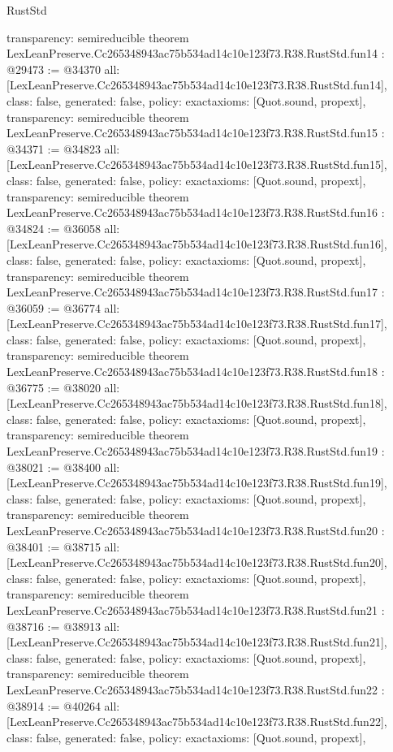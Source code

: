 \begin{lexlean}{RustStd}
\begin{coremodule}
{  transparency: semireducible
}
theorem LexLeanPreserve.Cc265348943ac75b534ad14c10e123f73.R38.RustStd.fun14 : @29473 := @34370 {
  all: [LexLeanPreserve.Cc265348943ac75b534ad14c10e123f73.R38.RustStd.fun14],
  class: false,
  generated: false,
  policy: exact{axioms: [Quot.sound, propext]},
  transparency: semireducible
}
theorem LexLeanPreserve.Cc265348943ac75b534ad14c10e123f73.R38.RustStd.fun15 : @34371 := @34823 {
  all: [LexLeanPreserve.Cc265348943ac75b534ad14c10e123f73.R38.RustStd.fun15],
  class: false,
  generated: false,
  policy: exact{axioms: [Quot.sound, propext]},
  transparency: semireducible
}
theorem LexLeanPreserve.Cc265348943ac75b534ad14c10e123f73.R38.RustStd.fun16 : @34824 := @36058 {
  all: [LexLeanPreserve.Cc265348943ac75b534ad14c10e123f73.R38.RustStd.fun16],
  class: false,
  generated: false,
  policy: exact{axioms: [Quot.sound, propext]},
  transparency: semireducible
}
theorem LexLeanPreserve.Cc265348943ac75b534ad14c10e123f73.R38.RustStd.fun17 : @36059 := @36774 {
  all: [LexLeanPreserve.Cc265348943ac75b534ad14c10e123f73.R38.RustStd.fun17],
  class: false,
  generated: false,
  policy: exact{axioms: [Quot.sound, propext]},
  transparency: semireducible
}
theorem LexLeanPreserve.Cc265348943ac75b534ad14c10e123f73.R38.RustStd.fun18 : @36775 := @38020 {
  all: [LexLeanPreserve.Cc265348943ac75b534ad14c10e123f73.R38.RustStd.fun18],
  class: false,
  generated: false,
  policy: exact{axioms: [Quot.sound, propext]},
  transparency: semireducible
}
theorem LexLeanPreserve.Cc265348943ac75b534ad14c10e123f73.R38.RustStd.fun19 : @38021 := @38400 {
  all: [LexLeanPreserve.Cc265348943ac75b534ad14c10e123f73.R38.RustStd.fun19],
  class: false,
  generated: false,
  policy: exact{axioms: [Quot.sound, propext]},
  transparency: semireducible
}
theorem LexLeanPreserve.Cc265348943ac75b534ad14c10e123f73.R38.RustStd.fun20 : @38401 := @38715 {
  all: [LexLeanPreserve.Cc265348943ac75b534ad14c10e123f73.R38.RustStd.fun20],
  class: false,
  generated: false,
  policy: exact{axioms: [Quot.sound, propext]},
  transparency: semireducible
}
theorem LexLeanPreserve.Cc265348943ac75b534ad14c10e123f73.R38.RustStd.fun21 : @38716 := @38913 {
  all: [LexLeanPreserve.Cc265348943ac75b534ad14c10e123f73.R38.RustStd.fun21],
  class: false,
  generated: false,
  policy: exact{axioms: [Quot.sound, propext]},
  transparency: semireducible
}
theorem LexLeanPreserve.Cc265348943ac75b534ad14c10e123f73.R38.RustStd.fun22 : @38914 := @40264 {
  all: [LexLeanPreserve.Cc265348943ac75b534ad14c10e123f73.R38.RustStd.fun22],
  class: false,
  generated: false,
  policy: exact{axioms: [Quot.sound, propext]},
}
\end{coremodule}
\end{lexlean}
